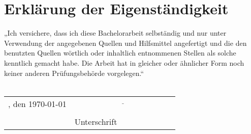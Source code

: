 \newpage
\thispagestyle{plain}
\chapter*{Erklärung der Eigenständigkeit}
\makeatletter %
„Ich versichere, dass ich diese Bachelorarbeit selbständig und nur unter Verwendung der angegebenen Quellen und Hilfsmittel angefertigt und die den benutzten Quellen wörtlich oder inhaltlich entnommenen Stellen als solche kenntlich gemacht habe. Die Arbeit hat in gleicher oder ähnlicher Form noch keiner anderen Prüfungsbehörde vorgelegen.“\\
\vspace{3em}\\
\begin{tabular}{@{}l l}
	\noindent
	\getLocation, den \today &\hspace{1cm} $\underline{\hspace{5cm}}$\\
	&\hspace{1cm} \getAuthor\\
	&\hspace{1cm} {\scriptsize Unterschrift}
\end{tabular}
\vspace{4cm}
